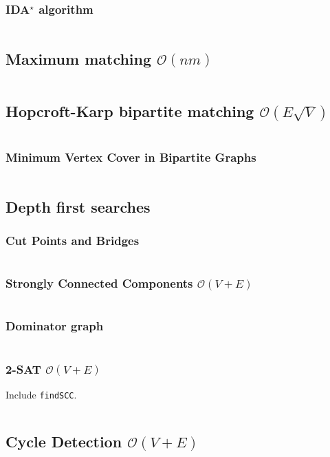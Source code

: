 \documentclass[8pt,a4paper,landscape,oneside]{amsart}
\newcommand{\mintedstyle}[2]{\inputminted[fontsize=\normalsize,baselinestretch=.9,breaklines,tabsize=2]{#1}{code/#2}}
\newcommand{\code}[1]{\mintedstyle{cpp}{#1}}
\begin{document}
\begin{multicols*}{3}
\subsubsection{IDA$^\star$ algorithm}
\code{graphs/idastar.cpp}

\subsection{Maximum matching $\mathcal{O}(n m)$}
\code{graphs/maxmatch.cpp}

\subsection{Hopcroft-Karp bipartite matching $\mathcal{O}(E \sqrt{V})$}
\code{graphs/hopcroft_karp.cpp}

\subsubsection{Minimum Vertex Cover in Bipartite Graphs}
\code{graphs/bipartite_mvc.cpp}

\subsection{Depth first searches}

\subsubsection{Cut Points and Bridges}
\code{graphs/cut_points_and_bridges.cpp}

\subsubsection{Strongly Connected Components $\mathcal{O}(V + E)$}
\code{graphs/scc.cpp}

\subsubsection{Dominator graph}
\code{graphs/dominator.cpp}

\subsubsection{2-SAT $\mathcal{O}(V+E)$}
Include \texttt{findSCC}.
\code{satsolver.cpp}

\subsection{Cycle Detection $\mathcal{O}(V + E)$}
\code{findcycle.cpp}


\end{multicols*}
\end{document}
